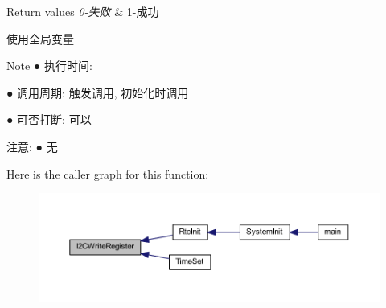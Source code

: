 \begin{DoxyRetVals}{\-Return values}
{\em 0-\/失败} & 1-\/成功 \\
\hline
\end{DoxyRetVals}
\begin{DoxyParagraph}{使用全局变量 }

\end{DoxyParagraph}
\begin{DoxyNote}{\-Note}
● 执行时间\-: \par
 ● 调用周期\-: 触发调用, 初始化时调用 \par
 ● 可否打断\-: 可以 \par

\end{DoxyNote}
\begin{DoxyParagraph}{注意\-:}
● 无 \par
 
\end{DoxyParagraph}


\-Here is the caller graph for this function\-:\nopagebreak
\begin{figure}[H]
\begin{center}
\leavevmode
\includegraphics[width=350pt]{group___i2_c_gae595c5041521bcb3d1d19a2d97bdf365_icgraph}
\end{center}
\end{figure}


